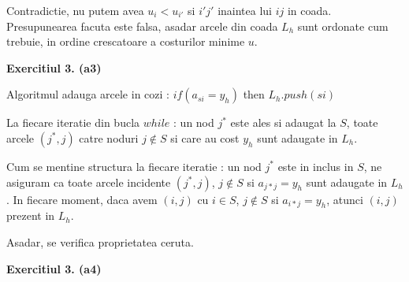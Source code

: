 \documentclass{article}
\begin{document}
Contradictie, nu putem avea $u_i < u_{i'}$ si $i'j'$ inaintea lui $ij$ in coada.
Presupunearea facuta este falsa, asadar arcele din coada $L_h$ sunt ordonate cum trebuie, in ordine crescatoare a costurilor minime $u$.

\textbf{Exercitiul 3. (a3) }

Algoritmul adauga arcele in cozi : $if (a_{si} = y_h)$ then $L_h.push(si)$

La fiecare iteratie din bucla $while$ : un nod $j^*$ este ales si adaugat la $S$, toate arcele $(j^*,j)$ catre noduri $j \notin S$ si care au cost $y_h$ sunt adaugate in $L_h$.

Cum se mentine structura la fiecare iteratie : un nod $j^*$ este in inclus in $S$, ne asiguram ca toate arcele incidente $(j^*,j)$, $j \notin S$ si $a_{j*j} = y_h$ sunt adaugate in $L_h$. In fiecare moment, daca avem $(i,j)$ cu $i \in S$, $j \notin S$ si $a_{i*j} = y_h$, atunci $(i,j)$ prezent in $L_h$.

Asadar, se verifica proprietatea ceruta.

\textbf{Exercitiul 3. (a4) }
\end{document}
